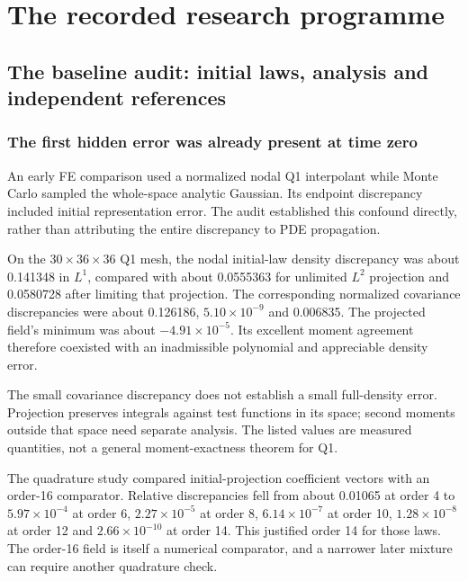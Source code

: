 \part{The recorded research programme}
\chapter{The baseline audit: initial laws, analysis and independent references}
\section{The first hidden error was already present at time zero}
An early FE comparison used a normalized nodal Q1 interpolant while Monte Carlo sampled the whole-space analytic Gaussian. Its endpoint discrepancy included initial representation error. The audit established this confound directly, rather than attributing the entire discrepancy to PDE propagation.

On the $30\times36\times36$ Q1 mesh, the nodal initial-law density discrepancy was about 0.141348 in $L^1$, compared with about 0.0555363 for unlimited $L^2$ projection and 0.0580728 after limiting that projection. The corresponding normalized covariance discrepancies were about 0.126186, $5.10\times10^{-9}$ and 0.006835. The projected field's minimum was about $-4.91\times10^{-5}$. Its excellent moment agreement therefore coexisted with an inadmissible polynomial and appreciable density error.

The small covariance discrepancy does not establish a small full-density error. Projection preserves integrals against test functions in its space; second moments outside that space need separate analysis. The listed values are measured quantities, not a general moment-exactness theorem for Q1.

The quadrature study compared initial-projection coefficient vectors with an order-16 comparator. Relative discrepancies fell from about 0.01065 at order 4 to $5.97\times10^{-4}$ at order 6, $2.27\times10^{-5}$ at order 8, $6.14\times10^{-7}$ at order 10, $1.28\times10^{-8}$ at order 12 and $2.66\times10^{-10}$ at order 14. This justified order 14 for those laws. The order-16 field is itself a numerical comparator, and a narrower later mixture can require another quadrature check.


